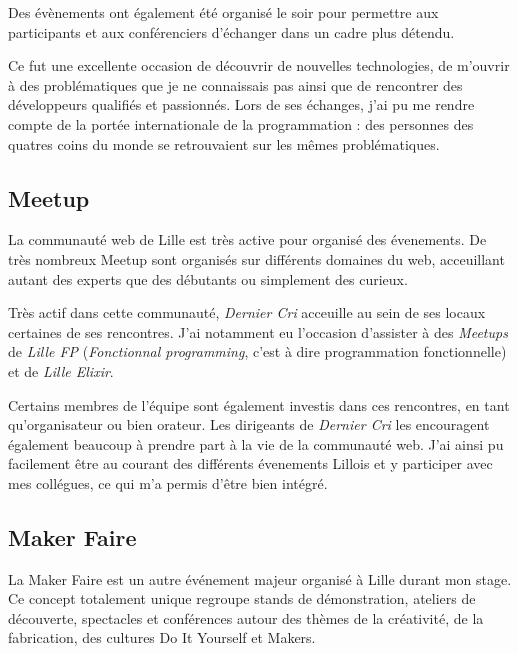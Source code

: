\bigskip

Des évènements ont également été organisé le soir pour permettre aux
participants et aux conférenciers d'échanger dans un cadre plus détendu.

\bigskip

Ce fut une excellente occasion de découvrir de nouvelles technologies,
de m'ouvrir à des problématiques que je ne connaissais pas ainsi que de
rencontrer des développeurs qualifiés et passionnés. Lors de ses
échanges, j'ai pu me rendre compte de la portée internationale de la
programmation : des personnes des quatres coins du monde se retrouvaient
sur les mêmes problématiques.

\bigskip

\subsection{Meetup}\label{meetup}

\bigskip

La communauté web de Lille est très active pour organisé des évenements.
De très nombreux Meetup sont organisés sur différents domaines du web,
acceuillant autant des experts que des débutants ou simplement des
curieux.

\bigskip

Très actif dans cette communauté, \emph{Dernier Cri} acceuille au sein
de ses locaux certaines de ses rencontres. J'ai notamment eu l'occasion
d'assister à des \emph{Meetups} de \emph{Lille FP} (\emph{Fonctionnal
programming}, c'est à dire programmation fonctionnelle) et de
\emph{Lille Elixir}.

\bigskip

Certains membres de l'équipe sont également investis dans ces
rencontres, en tant qu'organisateur ou bien orateur. Les dirigeants de
\emph{Dernier Cri} les encouragent également beaucoup à prendre part à
la vie de la communauté web. J'ai ainsi pu facilement être au courant
des différents évenements Lillois et y participer avec mes collégues, ce
qui m'a permis d'être bien intégré.

\bigskip

\subsection{Maker Faire}\label{maker-faire}

\bigskip

La Maker Faire est un autre événement majeur organisé à Lille durant mon
stage. Ce concept totalement unique regroupe stands de démonstration,
ateliers de découverte, spectacles et conférences autour des thèmes de
la créativité, de la fabrication, des cultures Do It Yourself et Makers.

